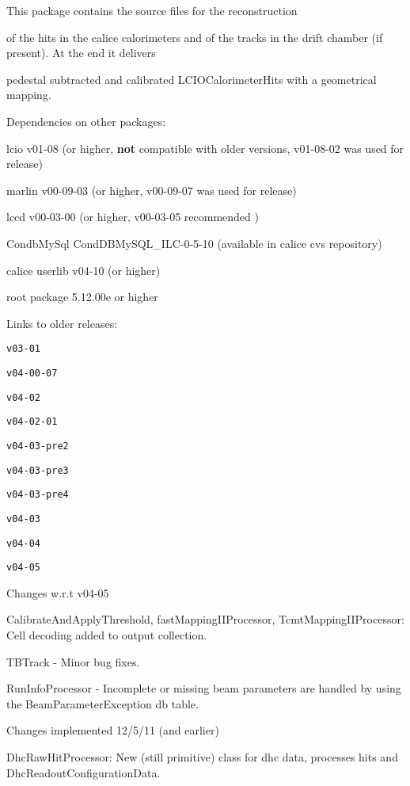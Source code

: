 This package contains the source files for the reconstruction\par
 of the hits in the calice calorimeters and of the tracks in the drift chamber (if present). At the end it delivers\par
 pedestal subtracted and calibrated LCIOCalorimeterHits with a geometrical mapping.\par


Dependencies on other packages: \par


lcio v01-\/08 (or higher, {\bfseries not} compatible with older versions, v01-\/08-\/02 was used for release)\par
 marlin v00-\/09-\/03 (or higher, v00-\/09-\/07 was used for release)\par
 lccd v00-\/03-\/00 (or higher, v00-\/03-\/05 recommended )\par
 CondbMySql CondDBMySQL\_\-ILC-\/0-\/5-\/10 (available in calice cvs repository)\par
 calice userlib v04-\/10 (or higher) \par
 root package 5.12.00e or higher \par
 Links to older releases:\par
 {\tt v03-\/01} \par
 {\tt v04-\/00-\/07} \par
 {\tt v04-\/02} \par
 {\tt v04-\/02-\/01} \par
 {\tt v04-\/03-\/pre2} \par
 {\tt v04-\/03-\/pre3} \par
 {\tt v04-\/03-\/pre4} \par
 {\tt v04-\/03} \par
 {\tt v04-\/04} \par
 {\tt v04-\/05} \par
  Changes w.r.t v04-\/05 \par

\begin{DoxyItemize}
\item CalibrateAndApplyThreshold, fastMappingIIProcessor, TcmtMappingIIProcessor: Cell decoding added to output collection.\par

\item TBTrack -\/ Minor bug fixes.\par

\item RunInfoProcessor -\/ Incomplete or missing beam parameters are handled by using the BeamParameterException db table.\par
  Changes implemented 12/5/11 (and earlier) 
\item DhcRawHitProcessor: New (still primitive) class for dhc data, processes hits and DhcReadoutConfigurationData. \par
 
\end{DoxyItemize}